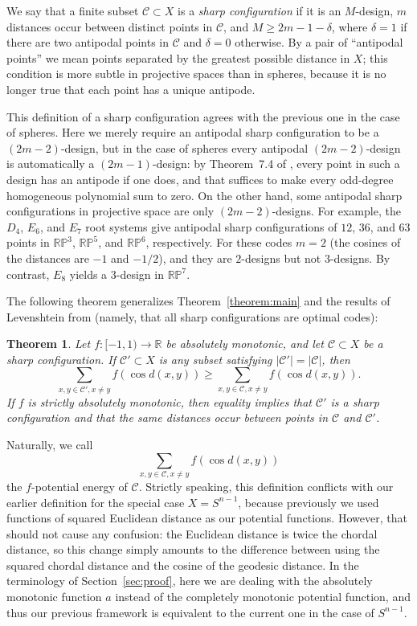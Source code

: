 \documentclass{jams-l}
\theoremstyle{plain}
\newtheorem{theorem}{Theorem}
\numberwithin{theorem}{section}
\theoremstyle{definition}
\numberwithin{equation}{section}
\newcommand{\R}{{\mathbb R}}
\newcommand{\Proj}{{\mathbb P}}
\newcommand{\CodeS}{\mathcal{C}}
\newcommand{\CodeT}{\mathcal{C}'}
\newcommand{\co}{\colon}
\begin{document}
We say that a finite subset $\CodeS \subset X$ is a \textit{sharp
configuration\/} if it is an $M$-design, $m$ distances occur
between distinct points in $\CodeS$, and $M \ge 2m-1-\delta$,
where $\delta=1$ if there are two antipodal points in $\CodeS$ and
$\delta=0$ otherwise.  By a pair of ``antipodal points'' we mean
points separated by the greatest possible distance in $X$; this
condition is more subtle in projective spaces than in spheres,
because it is no longer true that each point has a unique
antipode.

This definition of a sharp configuration agrees with the previous
one in the case of spheres. Here we merely require an antipodal
sharp configuration to be a $(2m-2)$-design, but in the case of
spheres every antipodal $(2m-2)$-design is automatically a
$(2m-1)$-design: by Theorem~7.4 of \cite{DGS}, every point in such
a design has an antipode if one does, and that suffices to make
every odd-degree homogeneous polynomial sum to zero.  On the other
hand, some antipodal sharp configurations in projective space are
only $(2m-2)$-designs.  For example, the $D_4$, $E_6$, and $E_7$
root systems give antipodal sharp configurations of $12$, $36$,
and $63$ points in $\R\Proj^3$, $\R\Proj^5$, and $\R\Proj^6$,
respectively.  For these codes $m=2$ (the cosines of the distances
are $-1$ and $-1/2$), and they are $2$-designs but not
$3$-designs. By contrast, $E_8$ yields a $3$-design in
$\R\Proj^7$.

The following theorem generalizes Theorem~\ref{theorem:main} and
the results of Levenshtein from \cite{L2} (namely, that all sharp
configurations are optimal codes):

\begin{theorem} \label{theorem:projective}
Let $f \co [-1,1) \to \R$ be absolutely monotonic, and let $\CodeS
\subset X$ be a sharp configuration. If $\CodeT \subset X$ is any
subset satisfying $|\CodeT|=|\CodeS|$, then
$$
\sum_{x,y \in \CodeT, x \ne y} f(\cos d(x,y)) \ge \sum_{x,y \in
\CodeS, x \ne y} f(\cos d(x,y)).
$$
If $f$ is strictly absolutely monotonic, then equality implies
that $\CodeT$ is a sharp configuration and that the same distances
occur between points in $\CodeS$ and $\CodeT$.
\end{theorem}

Naturally, we call
$$
\sum_{x,y \in \CodeS, x \ne y} f(\cos d(x,y))
$$
the $f$-potential energy of $\CodeS$.  Strictly speaking, this
definition conflicts with our earlier definition for the special
case $X=S^{n-1}$, because previously we used functions of squared
Euclidean distance as our potential functions.  However, that
should not cause any confusion: the Euclidean distance is twice
the chordal distance, so this change simply amounts to the
difference between using the squared chordal distance and the
cosine of the geodesic distance. In the terminology of
Section~\ref{sec:proof}, here we are dealing with the absolutely
monotonic function $a$ instead of the completely monotonic
potential function, and thus our previous framework is equivalent
to the current one in the case of $S^{n-1}$.
\end{document}
